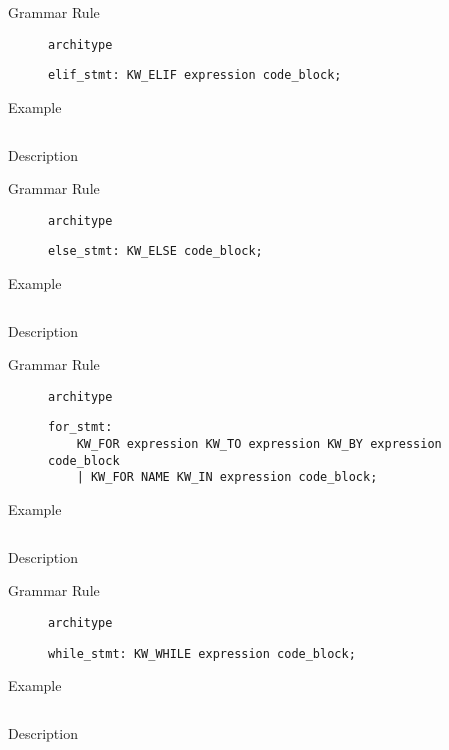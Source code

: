 \begin{description}
    \item[Grammar Rule] \texttt{architype}
          \begin{lstlisting}[style=gram]
elif_stmt: KW_ELIF expression code_block;
        \end{lstlisting}
    \item[Example] \texttt{}
          \begin{lstlisting}
        \end{lstlisting}

    \item[Description]
\end{description}


\begin{description}
    \item[Grammar Rule] \texttt{architype}
          \begin{lstlisting}[style=gram]
else_stmt: KW_ELSE code_block;
        \end{lstlisting}
    \item[Example] \texttt{}
          \begin{lstlisting}
        \end{lstlisting}

    \item[Description]
\end{description}


\begin{description}
    \item[Grammar Rule] \texttt{architype}
          \begin{lstlisting}[style=gram]
for_stmt:
    KW_FOR expression KW_TO expression KW_BY expression code_block
    | KW_FOR NAME KW_IN expression code_block;
        \end{lstlisting}
    \item[Example] \texttt{}
          \begin{lstlisting}
        \end{lstlisting}

    \item[Description]
\end{description}


\begin{description}
    \item[Grammar Rule] \texttt{architype}
          \begin{lstlisting}[style=gram]
while_stmt: KW_WHILE expression code_block;
        \end{lstlisting}
    \item[Example] \texttt{}
          \begin{lstlisting}
        \end{lstlisting}

    \item[Description]
\end{description}


